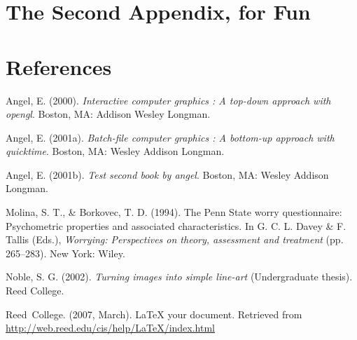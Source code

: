 \documentclass[12pt,twoside]{Mactemplate}
\theoremstyle{definition}
\theoremstyle{definition}
\theoremstyle{definition}
\theoremstyle{remark}
\begin{document}
\chapter{The Second Appendix, for
Fun}\label{the-second-appendix-for-fun}

\backmatter

\chapter*{References}\label{references}


\noindent

\setlength{\parindent}{-0.20in} \setlength{\leftskip}{0.20in}
\setlength{\parskip}{8pt}

\hypertarget{refs}{}
\hypertarget{ref-angel2000}{}
Angel, E. (2000). \emph{Interactive computer graphics : A top-down
approach with opengl}. Boston, MA: Addison Wesley Longman.

\hypertarget{ref-angel2001}{}
Angel, E. (2001a). \emph{Batch-file computer graphics : A bottom-up
approach with quicktime}. Boston, MA: Wesley Addison Longman.

\hypertarget{ref-angel2002a}{}
Angel, E. (2001b). \emph{Test second book by angel}. Boston, MA: Wesley
Addison Longman.

\hypertarget{ref-Molina1994}{}
Molina, S. T., \& Borkovec, T. D. (1994). The Penn State worry
questionnaire: Psychometric properties and associated characteristics.
In G. C. L. Davey \& F. Tallis (Eds.), \emph{Worrying: Perspectives on
theory, assessment and treatment} (pp. 265--283). New York: Wiley.

\hypertarget{ref-noble2002}{}
Noble, S. G. (2002). \emph{Turning images into simple line-art}
(Undergraduate thesis). Reed College.

\hypertarget{ref-reedweb2007}{}
Reed~College. (2007, March). LaTeX your document. Retrieved from
\url{http://web.reed.edu/cis/help/LaTeX/index.html}


\end{document}
